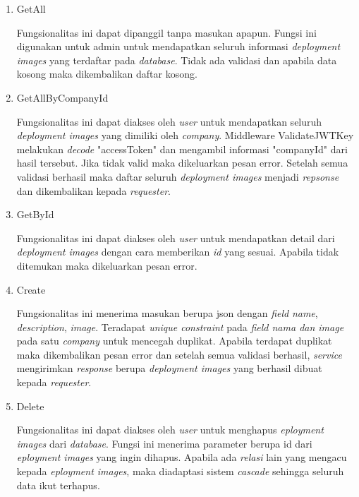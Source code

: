 \begin{enumerate}
  \item GetAll

        Fungsionalitas ini dapat dipanggil tanpa masukan apapun. Fungsi ini digunakan untuk admin untuk mendapatkan seluruh informasi \textit{deployment images} yang terdaftar pada \textit{database}. Tidak ada validasi dan apabila data kosong maka dikembalikan daftar kosong.

  \item GetAllByCompanyId

        Fungsionalitas ini dapat diakses oleh \textit{user} untuk mendapatkan seluruh \textit{deployment images} yang dimiliki oleh \textit{company}. Middleware ValidateJWTKey  melakukan \textit{decode} "accessToken" dan mengambil informasi "companyId" dari hasil tersebut. Jika tidak valid maka dikeluarkan pesan error. Setelah semua validasi berhasil maka daftar seluruh \textit{deployment images} menjadi \textit{repsonse} dan dikembalikan kepada \textit{requester}.

  \item GetById

        Fungsionalitas ini dapat diakses oleh \textit{user} untuk mendapatkan detail dari \textit{deployment images} dengan cara memberikan \textit{id} yang sesuai. Apabila tidak ditemukan maka dikeluarkan pesan error.

  \item Create

        Fungsionalitas ini menerima masukan berupa json dengan \textit{field} \textit{name}, \textit{description}, \textit{image}. Teradapat \textit{unique constraint} pada \textit{field nama dan image} pada satu \textit{company} untuk mencegah duplikat. Apabila terdapat duplikat maka dikembalikan pesan error dan setelah semua validasi berhasil, \textit{service} mengirimkan \textit{response} berupa \textit{deployment images} yang berhasil dibuat kepada \textit{requester}.

  \item Delete

        Fungsionalitas ini dapat diakses oleh \textit{user} untuk menghapus \textit{eployment images} dari \textit{database}. Fungsi ini menerima parameter berupa id dari \textit{eployment images} yang ingin dihapus. Apabila ada \textit{relasi} lain yang mengacu kepada \textit{eployment images}, maka diadaptasi sistem \textit{cascade} sehingga seluruh data ikut terhapus.

\end{enumerate}

